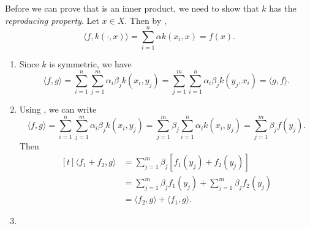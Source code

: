 Before we can prove that  is an inner product, we need to show that \(k\) has the \textit{reproducing property}.
Let \(x \in X\).
Then by ,
\begin{equation}
    \langle f, k(\cdot, x) \rangle = \sum_{i=1}^{n} \alpha k(x_i, x) = f(x).
\end{equation}

\begin{enumerate}
    \item Since \(k\) is symmetric, we have
    \begin{equation}
        \langle f, g \rangle
        = \sum_{i=1}^{n} \sum_{j=1}^{m} \alpha_i \beta_j k(x_i, y_j)
        = \sum_{j=1}^{m}\sum_{i=1}^{n}  \alpha_i \beta_j k(y_j, x_i)
        = \langle g, f \rangle.
    \end{equation}
    \item Using , we can write
    \begin{equation}
        \langle f, g \rangle
        = \sum_{i=1}^{n} \sum_{j=1}^{m} \alpha_i \beta_j k(x_i, y_j)
        = \sum_{j=1}^{m} \beta_j \sum_{i=1}^{n} \alpha_i k(x_i, y_j)
        = \sum_{j=1}^{m} \beta_j f(y_j).
    \end{equation}
    Then
    \begin{equation}
        \begin{aligned}[t]
            \langle f_1 + f_2, g \rangle
            &= \sum_{j=1}^{m} \beta_j \left[f_1(y_j) + f_2(y_j)\right]\\
            &= \sum_{j=1}^{m} \beta_j f_1(y_j) + \sum_{j=1}^{m} \beta_j f_2(y_j)\\
            &= \langle f_2, g \rangle + \langle f_1, g \rangle.
        \end{aligned}
    \end{equation}
    \item 
\end{enumerate}

